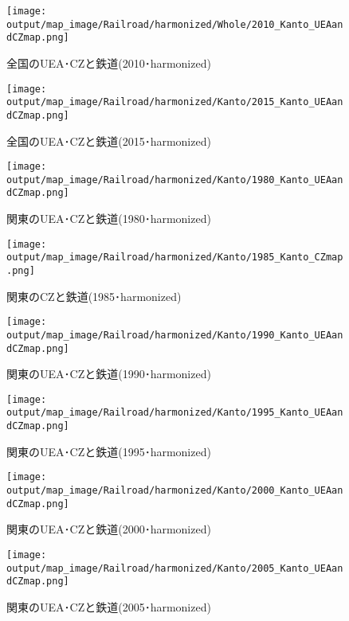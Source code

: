 \documentclass{ltjsarticle}
\begin{document}
\begin{figure}[pbth]
  \centering
  \texttt{[image: output/map\_image/Railroad/harmonized/Whole/2010\_Kanto\_UEAandCZmap.png]}
  \caption{\label{ham:2010:allCZandUEA:Rail}全国のUEA･CZと鉄道(2010･harmonized)}
\end{figure}


\begin{figure}[pbth]
  \centering
  \texttt{[image: output/map\_image/Railroad/harmonized/Kanto/2015\_Kanto\_UEAandCZmap.png]}
  \caption{\label{ham:2015:allCZandUEA:Rail}全国のUEA･CZと鉄道(2015･harmonized)}
\end{figure}

\begin{figure}[pbth]
  \centering
  \texttt{[image: output/map\_image/Railroad/harmonized/Kanto/1980\_Kanto\_UEAandCZmap.png]}
  \caption{\label{ham:1980:KanCZandUEA:Rail}関東のUEA･CZと鉄道(1980･harmonized)}
\end{figure}


\begin{figure}[pbth]
  \centering
  \texttt{[image: output/map\_image/Railroad/harmonized/Kanto/1985\_Kanto\_CZmap.png]}
  \caption{\label{ham:1985:KanCZandUEA:Rail}関東のCZと鉄道(1985･harmonized)}
\end{figure}


\begin{figure}[pbth]
  \centering
  \texttt{[image: output/map\_image/Railroad/harmonized/Kanto/1990\_Kanto\_UEAandCZmap.png]}
  \caption{\label{ham:1990:KanCZandUEA:Rail}関東のUEA･CZと鉄道(1990･harmonized)}
\end{figure}


\begin{figure}[pbth]
  \centering
  \texttt{[image: output/map\_image/Railroad/harmonized/Kanto/1995\_Kanto\_UEAandCZmap.png]}
  \caption{\label{ham:1995:KanCZandUEA:Rail}関東のUEA･CZと鉄道(1995･harmonized)}
\end{figure}


\begin{figure}[pbth]
  \centering
  \texttt{[image: output/map\_image/Railroad/harmonized/Kanto/2000\_Kanto\_UEAandCZmap.png]}
  \caption{\label{ham:2000:KanCZandUEA:Rail}関東のUEA･CZと鉄道(2000･harmonized)}
\end{figure}


\begin{figure}[pbth]
  \centering
  \texttt{[image: output/map\_image/Railroad/harmonized/Kanto/2005\_Kanto\_UEAandCZmap.png]}
  \caption{\label{ham:2005:KanCZandUEA:Rail}関東のUEA･CZと鉄道(2005･harmonized)}
\end{figure}
\end{document}
